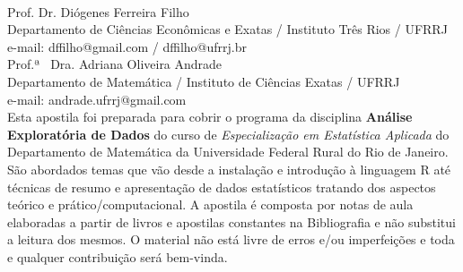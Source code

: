 \documentclass[11pt,fleqn]{book} %
\begin{document}

\begingroup
\thispagestyle{empty} %
\vfill
\endgroup


\newpage
~\vfill
\thispagestyle{empty}

\noindent Prof. Dr. Diógenes Ferreira Filho\\
\noindent Departamento de Ciências Econômicas e Exatas / Instituto Três Rios / UFRRJ\\ %
\noindent e-mail: dffilho@gmail.com / dffilho@ufrrj.br\\ %

\noindent Prof.ª \, Dra. Adriana Oliveira Andrade\\
\noindent Departamento de Matemática / Instituto de Ciências Exatas / UFRRJ\\ %
\noindent e-mail: andrade.ufrrj@gmail.com\\ %


\noindent Esta apostila foi preparada para cobrir o programa da disciplina {\bf Análise Exploratória de Dados} do curso de {\itshape Especialização em Estatística Aplicada} do Departamento de Matemática  da Universidade Federal Rural do Rio de Janeiro. São abordados temas que vão desde a instalação e introdução à linguagem R até técnicas de resumo e apresentação de dados estatísticos tratando dos aspectos teórico e prático/computacional. A apostila é composta por notas de aula elaboradas a partir de livros e apostilas constantes na Bibliografia e não substitui a leitura dos mesmos. O material não está livre de erros e/ou imperfeições e toda e qualquer contribuição será bem-vinda.\\ %
\end{document}
